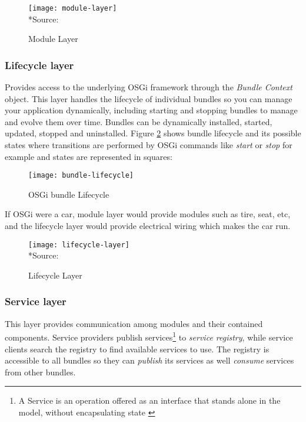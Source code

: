 \begin{figure}[h]
\caption{Module Layer}
\label{module layer}
\centering
\texttt{[image: module-layer]}
\\*Source: \cite{conceptual layers 2011}
\end{figure}
\FloatBarrier

\subsubsection{Lifecycle layer}
Provides access to the underlying OSGi framework through the \emph{Bundle Context} object. This layer handles the lifecycle of individual bundles so you can manage your application dynamically, including starting and stopping bundles to manage and evolve them over time. Bundles can be dynamically installed, started, updated, stopped and uninstalled. Figure \ref{bundle lifecycle} shows bundle lifecycle and its possible states where transitions are performed by OSGi commands like \emph{start} or \emph{stop} for example and states are represented in squares:

\begin{figure}[h]
\caption{OSGi bundle Lifecycle}
\label{bundle lifecycle}
\centering
\texttt{[image: bundle-lifecycle]}
\end{figure}
\FloatBarrier

If OSGi were a car, module layer would provide modules such as tire, seat, etc, and the lifecycle layer would provide electrical wiring which makes the car run. 

\begin{figure}[h]
\label{lifecycle layer}
\caption{Lifecycle Layer}
\centering
\texttt{[image: lifecycle-layer]}
\\*Source: \cite{conceptual layers 2011}
\end{figure}
\FloatBarrier

\subsubsection{Service layer}
This layer provides communication among modules and their contained components. Service providers publish services\footnote{A Service is an operation offered as an interface that stands alone in the model, without encapsulating state \citep{Evans 2003}} to \emph{service registry}, while service clients search the registry to find available services to use. The registry is accessible to all bundles so they can \emph{publish} its services as well \emph{consume} services from other bundles.  


